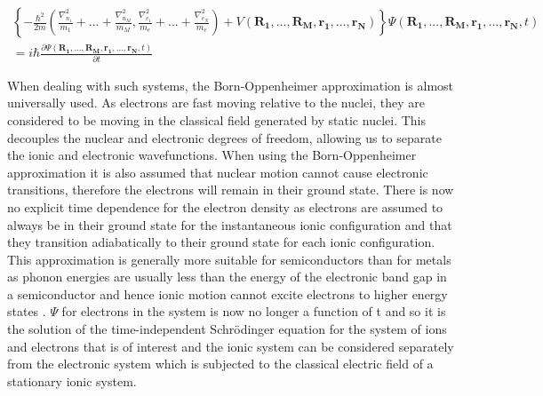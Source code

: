 \documentclass[11pt, twoside]{report}
\begin{document}
\begin{multline}  \label{many_SE}
\left\{ - \frac{\hbar^2}{2m} \left( \frac{\nabla_{n_1}^2}{m_1} + ... + \frac{\nabla_{n_M}^2}{m_M}, 
\frac{\nabla_{e_1}^2}{m_e} + ... + \frac{\nabla_{e_N}^2}{m_e} \right)
+ V \left( \mathbf{R_1},...,\mathbf{R_M}, \mathbf{r_1}, ..., \mathbf{r_N} \right)
\right\}
\Psi (\mathbf{R_1},...,\mathbf{R_M}, \mathbf{r_1}, ..., \mathbf{r_N}, t) \\
= i\hbar \frac{\partial\Psi(\mathbf{R_1},...,\mathbf{R_M}, \mathbf{r_1}, ..., \mathbf{r_N},t)}{\partial t}
\end{multline}

When dealing with such systems, the Born-Oppenheimer approximation is almost universally used. As electrons are fast moving relative to the nuclei, they are considered to be moving in the classical field generated by static nuclei. This decouples the nuclear and electronic degrees of freedom, allowing us to separate the ionic and electronic wavefunctions. 
When using the Born-Oppenheimer approximation it is also assumed that nuclear motion cannot cause electronic transitions, therefore the electrons will remain in their ground state. There is now no explicit time dependence for the electron density as electrons are assumed to always be in their ground state for the instantaneous ionic configuration and that they transition adiabatically to their ground state for each ionic configuration. This approximation is generally more suitable for semiconductors than for metals as phonon energies are usually less than the energy of the electronic band gap in a semiconductor and hence ionic motion cannot excite electrons to higher energy states \cite{Prasad_ch2}. $\Psi$ for electrons in the system is now no longer a function of t and so it is the solution of the time-independent Schr{\"o}dinger equation for the system of ions and electrons that is of interest and the ionic system can be considered separately from the electronic system which is subjected to the classical electric field of a stationary ionic system.
\end{document}

